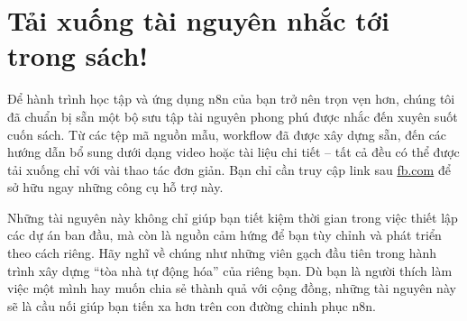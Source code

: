 \documentclass[a4paper,12pt]{book}
\begin{document}
\newpage

\section*{Tải xuống tài nguyên nhắc tới trong sách!}
    
\begin{center}
    
\end{center}


Để hành trình học tập và ứng dụng n8n của bạn trở nên trọn vẹn hơn, chúng tôi đã chuẩn bị sẵn một bộ sưu tập tài nguyên phong phú được nhắc đến xuyên suốt cuốn sách. Từ các tệp mã nguồn mẫu, workflow đã được xây dựng sẵn, đến các hướng dẫn bổ sung dưới dạng video hoặc tài liệu chi tiết – tất cả đều có thể được tải xuống chỉ với vài thao tác đơn giản. Bạn chỉ cần truy cập link sau \href{fb.com}{fb.com} để sở hữu ngay những công cụ hỗ trợ này.

Những tài nguyên này không chỉ giúp bạn tiết kiệm thời gian trong việc thiết lập các dự án ban đầu, mà còn là nguồn cảm hứng để bạn tùy chỉnh và phát triển theo cách riêng. Hãy nghĩ về chúng như những viên gạch đầu tiên trong hành trình xây dựng “tòa nhà tự động hóa” của riêng bạn. Dù bạn là người thích làm việc một mình hay muốn chia sẻ thành quả với cộng đồng, những tài nguyên này sẽ là cầu nối giúp bạn tiến xa hơn trên con đường chinh phục n8n.
\end{document}
